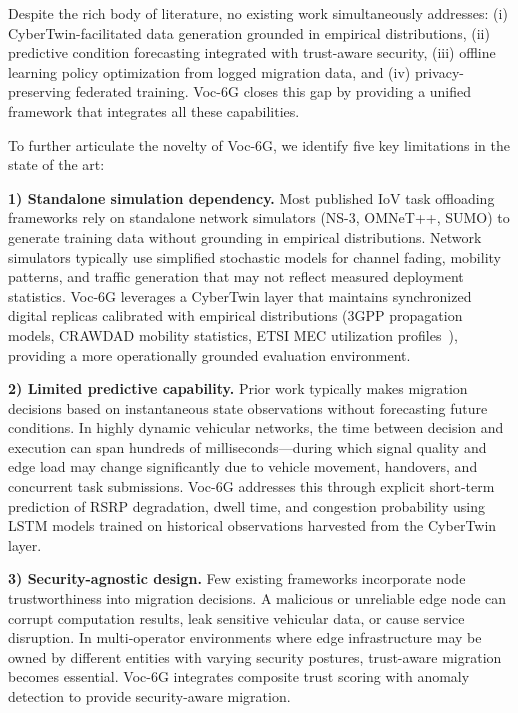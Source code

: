 \documentclass[journal,twoside]{IEEEtran}
\newcommand{\VocSixG}{Voc-6G}
\begin{document}
Despite the rich body of literature, no existing work simultaneously addresses: (i) CyberTwin-facilitated data generation grounded in empirical distributions, (ii) predictive condition forecasting integrated with trust-aware security, (iii) offline learning policy optimization from logged migration data, and (iv) privacy-preserving federated training. \VocSixG{} closes this gap by providing a unified framework that integrates all these capabilities.

To further articulate the novelty of \VocSixG{}, we identify five key limitations in the state of the art:

\textbf{1) Standalone simulation dependency.} Most published IoV task offloading frameworks rely on standalone network simulators (NS-3, OMNeT++, SUMO) to generate training data without grounding in empirical distributions. Network simulators typically use simplified stochastic models for channel fading, mobility patterns, and traffic generation that may not reflect measured deployment statistics. \VocSixG{} leverages a CyberTwin layer that maintains synchronized digital replicas calibrated with empirical distributions (3GPP propagation models, CRAWDAD mobility statistics, ETSI MEC utilization profiles~\cite{etsi_mec003}), providing a more operationally grounded evaluation environment.

\textbf{2) Limited predictive capability.} Prior work typically makes migration decisions based on instantaneous state observations without forecasting future conditions. In highly dynamic vehicular networks, the time between decision and execution can span hundreds of milliseconds---during which signal quality and edge load may change significantly due to vehicle movement, handovers, and concurrent task submissions. \VocSixG{} addresses this through explicit short-term prediction of RSRP degradation, dwell time, and congestion probability using LSTM models trained on historical observations harvested from the CyberTwin layer.

\textbf{3) Security-agnostic design.} Few existing frameworks incorporate node trustworthiness into migration decisions. A malicious or unreliable edge node can corrupt computation results, leak sensitive vehicular data, or cause service disruption. In multi-operator environments where edge infrastructure may be owned by different entities with varying security postures, trust-aware migration becomes essential. \VocSixG{} integrates composite trust scoring with anomaly detection to provide security-aware migration.
\end{document}
